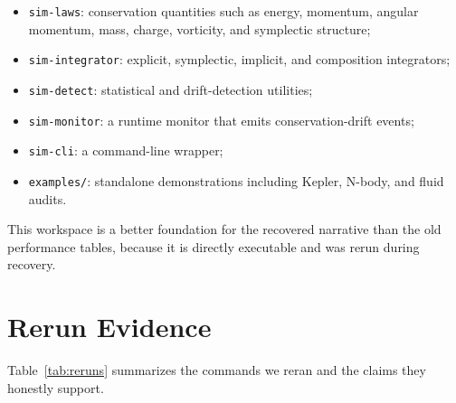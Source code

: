 \documentclass[11pt]{article}
\begin{document}
\begin{itemize}
  \item \texttt{sim-laws}: conservation quantities such as energy, momentum, angular momentum, mass, charge, vorticity, and symplectic structure;
  \item \texttt{sim-integrator}: explicit, symplectic, implicit, and composition integrators;
  \item \texttt{sim-detect}: statistical and drift-detection utilities;
  \item \texttt{sim-monitor}: a runtime monitor that emits conservation-drift events;
  \item \texttt{sim-cli}: a command-line wrapper;
  \item \texttt{examples/}: standalone demonstrations including Kepler, N-body, and fluid audits.
\end{itemize}

This workspace is a better foundation for the recovered narrative than the old performance tables, because it is directly executable and was rerun during recovery.

\section{Rerun Evidence}
Table~\ref{tab:reruns} summarizes the commands we reran and the claims they honestly support.
\end{document}
